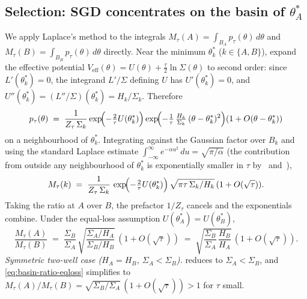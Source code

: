 \documentclass[11pt,a4paper]{article}
\theoremstyle{definition}
\theoremstyle{remark}
\newcommand{\Veff}{V_{\mathrm{eff}}}
\begin{document}
\subsection{Selection: SGD concentrates on the basin of $\theta_A^*$}

We apply Laplace's method to the integrals $M_\tau(A) = \int_{B_A}
p_\tau(\theta)\,d\theta$ and $M_\tau(B) = \int_{B_B} p_\tau(\theta)\,
d\theta$ directly.  Near the minimum $\theta_k^*$ ($k\in\{A,B\}$),
expand the effective potential $\Veff(\theta) = U(\theta) +
\tfrac{\tau}{2}\ln\Sigma(\theta)$ to second order: since $L'(\theta_k^*)
= 0$, the integrand $L'/\Sigma$ defining $U$ has $U'(\theta_k^*)=0$, and
$U''(\theta_k^*) = (L''/\Sigma)(\theta_k^*) = H_k/\Sigma_k$.  Therefore
\[
   p_\tau(\theta) \;=\; \frac{1}{Z_\tau\,\Sigma_k}
        \exp\!\Bigl(-\tfrac{2}{\tau}U(\theta_k^*)\Bigr)
        \exp\!\Bigl(-\tfrac{1}{\tau}\,\tfrac{H_k}{\Sigma_k}\,
                                 (\theta-\theta_k^*)^2\Bigr)
        (1 + O(\theta-\theta_k^*))
\]
on a neighbourhood of $\theta_k^*$.  Integrating against the Gaussian
factor over $B_k$ and using the standard Laplace estimate
$\int_{-\infty}^{\infty} e^{-\alpha u^2}\,du = \sqrt{\pi/\alpha}$ (the
contribution from outside any neighbourhood of $\theta_k^*$ is
exponentially smaller in $\tau$ by~ and~),
\[
   M_\tau(k) \;=\; \frac{1}{Z_\tau\,\Sigma_k}\,
        \exp\!\Bigl(-\tfrac{2}{\tau}U(\theta_k^*)\Bigr)\,
        \sqrt{\pi\tau\,\Sigma_k/H_k}\,(1 + O(\sqrt\tau)).
\]
Taking the ratio at $A$ over $B$, the prefactor $1/Z_\tau$ cancels
and the exponentials combine.  Under the equal-loss assumption
$U(\theta_A^*) = U(\theta_B^*)$,
\begin{equation}\label{eq:basin-ratio-eqloss}
   \frac{M_\tau(A)}{M_\tau(B)}
   \;=\; \frac{\Sigma_B}{\Sigma_A}\,
         \sqrt{\frac{\Sigma_A/H_A}{\Sigma_B/H_B}}\,(1+O(\sqrt\tau))
   \;=\; \sqrt{\frac{\Sigma_B}{\Sigma_A}\,\frac{H_B}{H_A}}\,
                                                       (1+O(\sqrt\tau)).
\end{equation}
\emph{Symmetric two-well case ($H_A = H_B$, $\Sigma_A < \Sigma_B$).}
 reduces to $\Sigma_A < \Sigma_B$, and
\eqref{eq:basin-ratio-eqloss} simplifies to $M_\tau(A)/M_\tau(B) =
\sqrt{\Sigma_B/\Sigma_A}\,(1+O(\sqrt\tau)) > 1$ for $\tau$ small.
\end{document}
